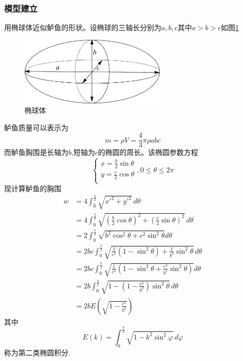 \documentclass[UTF8,a4paper]{ctexart}
\numberwithin{equation}{section}%
\numberwithin{table}{section}
\numberwithin{figure}{section}
\begin{document}
\subsubsection{模型建立}
用椭球体近似鲈鱼的形状。设椭球的三轴长分别为$a,b,c$其中$a>b>c$如图\ref{tuoqiu}
\begin{figure}[!htp]
	\centering
	\includegraphics[width=7cm]{tuoqiu.pdf}
	\caption{椭球体}
	\label{tuoqiu}
\end{figure}
鲈鱼质量可以表示为\begin{equation}
	m=\rho V=\frac{4}{3}\pi \rho a b c
	\label{m2}
\end{equation}
而鲈鱼胸围是长轴为$b$,短轴为$c$的椭圆的周长。该椭圆参数方程
\begin{equation}
	\begin{cases}
		x=\frac{b}{2}\sin\theta\\
		y=\frac{c}{2}\cos\theta\\
	\end{cases},0\le\theta\le 2\pi
	\label{canshu}
\end{equation}
现计算鲈鱼的胸围
\begin{equation}
	\begin{split}
		w&=4\int_0^{\frac{\pi}{2}}\sqrt{x'^2+y'^2}\,d\theta\\
		&=4\int_0^{\frac{\pi}{2}}\sqrt{\left(\frac{b}{2}\cos\theta\right)^2+\left(\frac{c}{2}\sin\theta\right)^2}\,d\theta\\
		&=2\int_0^{\frac{\pi}{2}}\sqrt{b^2\cos^2\theta+c^2\sin^2\theta}d\theta\\
		&=2bc\int_0^{\frac{\pi}{2}}\sqrt{\frac{1}{c^2}(1-\sin^2\theta)+\frac{1}{b^2}\sin^2\theta}\,d\theta\\
		&=2bc\int_0^{\frac{\pi}{2}}\sqrt{\frac{1}{c^2}\left(1-\sin^2\theta+\frac{c^2}{b^2}\sin^2\theta\right)}d\theta\\
		&=2b\int_0^{\frac{\pi}{2}}\sqrt{1-(1-\frac{c^2}{b^2})\sin^2\theta}\,d\theta\\\
		&=2b E\left(\sqrt{1-\frac{c^2}{b^2}}\right)
	\end{split}
	\label{jifen}
\end{equation}
其中\begin{equation}
	E(k)=\int_0^{\frac{\pi}{2}}\sqrt{1-k^2\sin^2\varphi}\,d\varphi
	\label{Ek}
\end{equation}称为第二类椭圆积分.
\end{document}
